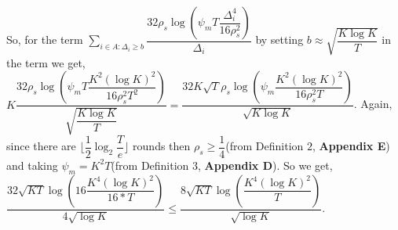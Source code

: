 \begin{remark}
\label{Result:Rem:3}
So, for the term $\sum_{i\in A:\Delta_{i}\geq b}\dfrac{32\rho_{s}\log{(\psi_{m}T\dfrac{\Delta_{i}^{4}}{16\rho_{s}^{2}})}}{\Delta_{i}}$ by setting $b\approx \sqrt{\dfrac{K\log K}{T}}$ in the term we get, $K\dfrac{32\rho_{s}\log{(\psi_{m}T\dfrac{K^{2}(\log K)^{2}}{16\rho_{s}^{2}T^{2}})}}{\sqrt{\dfrac{K\log K}{T}}}=\dfrac{32K\sqrt{T}\rho_{s}\log{(\psi_{m}\dfrac{K^{2}(\log K)^{2}}{16\rho_{s}^{2}T})}}{ \sqrt{K\log K}}$. Again, since there are $\big \lfloor \dfrac{1}{2}\log_{2} \dfrac{T}{e}\big\rfloor$ rounds then $\rho_{s}\geq \dfrac{1}{4}$(from Definition $2$, \textbf{Appendix E}) and taking $\psi_{m}=K^{2}T$(from Definition $3$, \textbf{Appendix D}). So we get, $\dfrac{32\sqrt{KT}\log{(16\dfrac{K^{4}(\log K)^{2}}{16*T})}}{4\sqrt{\log K}} \leq \dfrac{8\sqrt{KT}\log{(\dfrac{K^{4}(\log K)^{2}}{T})}}{\sqrt{\log K}}$.
\end{remark}



